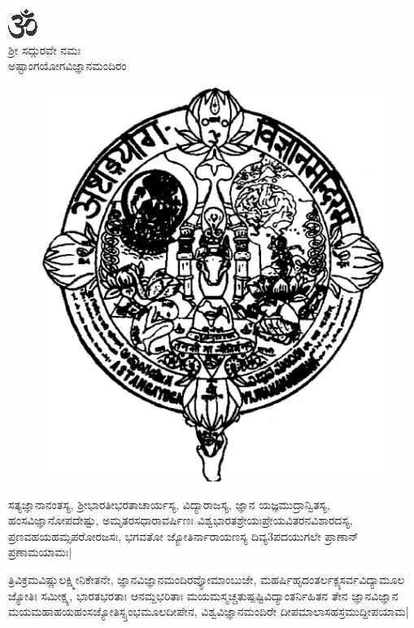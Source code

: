 

\newpage

\begin{center}
{\includegraphics[scale=1]{om.eps}}\\[5pt]

{\normalsize ಶ್ರೀ ಸದ್ಗುರವೇ ನಮಃ }\\[5pt]

{\large ಅಷ್ಟಾಂಗಯೋಗವಿಜ್ಞಾನಮಂದಿರಂ}
\end{center}
\vskip -20pt

\begin{figure}[h]
\centering
{\includegraphics[scale=.18]{0000d.eps}}
\end{figure}

ಸತ್ಯಜ್ಞಾನಾನಂತಸ್ಯ, ಶ್ರೀಭಾರತೀಭರತಾಚಾರ್ಯಸ್ಯ, ವಿದ್ಯಾರಾಜಸ್ಯ, ಜ್ಞಾನ ಯಜ್ಞಮುದ್ರಾನ್ವಿತಸ್ಯ, ಹಂಸವಿಜ್ಞಾನೋಪದೇಷ್ಟು, ಅಮೃತರಸಧಾರಾವರ್ಷಿಣಃ ವಿಶ್ವಭಾರತಶ್ರೇಯಃಪ್ರೇಯವಿತರನವಿಶಾರದಸ್ಯ, ಪ್ರಣವಹಯಹಮ್ಸಪರೋರಜಸಃ, ಭಗವತೋ ಜ್ಯೋತಿರ್ನಾರಾಯಣಸ್ಯ ದಿವ್ಯ3ಪದಯುಗಲೇ ಪ್ರಾಣಾನ್ ಪ್ರಣಾಮಯಾಮಃ|

ತ್ರಿವಿಕ್ರಮವಿಷ್ಣುಲಕ್ಷ್ಮೀನಿಕೇತನೇ, ಜ್ಞಾನವಿಜ್ಞಾನಮಂದಿರವ್ಯೋಮಾಂಬುಜೇ, ಮಹರ್ಷಿಹೃದಂತರ್ಲಕ್ಪ್ಯಸರ್ವವಿದ್ಯಾಮೂಲ ಜ್ಯೋತಿಃ  ಸಮೀಕ್ಷ್ಯ, ಭಾರತಭರತಾಃ ಆನಮ್ದಭರಿತಾಃ ಮಯಮಸ್ಮಚ್ಚತುಷ್ಪಷ್ಟಿವಿದ್ಯಾಂತರ್ನಿಹಿತನ ತೇನ ಜ್ಞಾನವಿಜ್ಞಾನ ಮಯಮಹಾಹಯಹಂಸಜ್ಯೋತಿಸ್ಸ್ತಂಭಮೂಲದೀಪೇನ, ವಿಶ್ವವಿಜ್ಞಾನಮಂದಿರೇ ದೀಪಮಾಲಾಸಹಸ್ರಮುದ್ದೀಪಯಾಮ|

